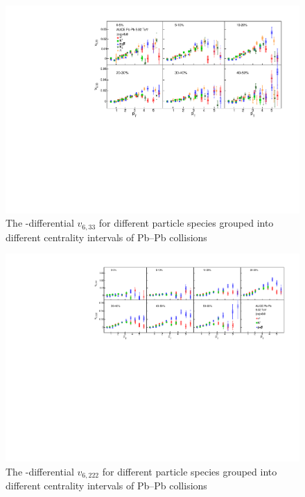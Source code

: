 \begin{figure}[!htb]
\begin{center}
\includegraphics[scale=0.62]{figures/results/All_v633_gap00.pdf}
\end{center}
\caption{The \pT-differential $v_{6,33}$ for different particle species grouped into different centrality intervals of Pb--Pb collisions \sNN}
\label{v633_particleDependence}
\end{figure}

\begin{figure}[!htb]
\begin{center}
\includegraphics[scale=0.82]{figures/results/All_v6222_gap00.pdf}
\end{center}
\caption{The \pT-differential $v_{6,222}$ for different particle species grouped into different centrality intervals of Pb--Pb collisions \sNN}
\label{v6222_particleDependence}
\end{figure}

